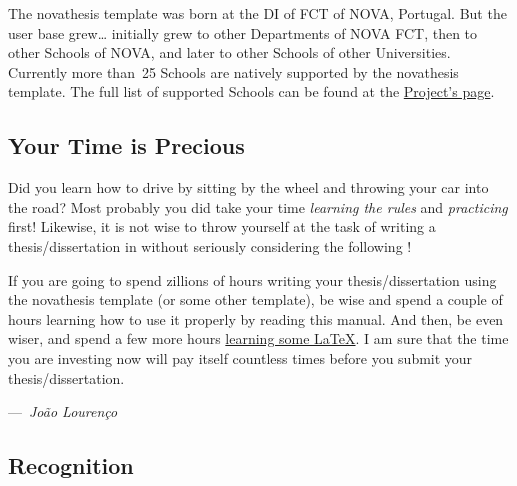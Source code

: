 
The \gls{novathesis} template was born at the \gls{DI} of  \gls{FCT} of \gls{NOVA}, Portugal.  But the user base grew… initially grew to other Departments of NOVA FCT, then to other Schools of NOVA, and later to other Schools of other Universities.  Currently more than~25 Schools are natively supported by the \gls{novathesis} template.  The full list of supported Schools can be found at the
\href{https://github.com/joaomlourenco/novathesis}{Project's  page}.

    
\subsection{Your Time is Precious}
\label{sub:time_is_money}

Did you learn how to drive by sitting by the wheel and throwing your car into the road?  Most probably you did take your time \emph{learning the rules} and \emph{practicing} first! Likewise, it is not wise to throw yourself at the task of writing a thesis/dissertation in  without seriously considering the following !

\begin{highlightbox}
  If you are going to spend zillions of hours writing your thesis/dissertation using the \gls{novathesis}  template (or some other  template), be wise and spend a couple of hours learning how to use it properly by reading this manual.  And then, be even wiser, and spend a few more hours \href{https://github.com/joaomlourenco/novathesis/wiki\#learning-latex}{learning some \LaTeX}.  I am sure that the time you are investing now will pay itself countless times before you submit your thesis/dissertation.\\\parbox{\linewidth}{\raggedleft---~\emph{João Lourenço}}
\end{highlightbox}

\subsection{Recognition}
\label{sub:recognition}

\ntindex[recognition]{}

